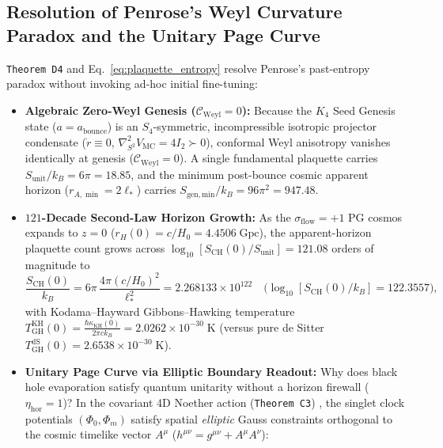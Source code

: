 \documentclass[11pt,a4paper]{article}
\theoremstyle{remark}
\begin{document}
\subsection{Resolution of Penrose's Weyl Curvature Paradox and the Unitary Page Curve}

\texttt{Theorem D4} and Eq.~\eqref{eq:plaquette_entropy} resolve Penrose's past-entropy paradox \cite{Penrose1979Weyl} without invoking ad-hoc initial fine-tuning:
\begin{itemize}
  \item \textbf{Algebraic Zero-Weyl Genesis ($\mathcal{C}_{\mathrm{Weyl}} = 0$):} Because the $K_4$ Seed Genesis state ($a = a_{\mathrm{bounce}}$) is an $S_4$-symmetric, incompressible isotropic projector condensate ($\dot{r} \equiv 0$, $\nabla^2_{S^2} V_{\mathrm{MC}} = 4I_2 \succ 0$), conformal Weyl anisotropy vanishes identically at genesis ($\mathcal{C}_{\mathrm{Weyl}} = 0$). A single fundamental plaquette carries $S_{\mathrm{unit}}/k_B = 6\pi = 18.85$, and the minimum post-bounce cosmic apparent horizon ($r_{A,\min} = 2\ell_*$) carries $S_{\mathrm{gen,min}}/k_B = 96\pi^2 = 947.48$.
  \item \textbf{$121$-Decade Second-Law Horizon Growth:} As the $\sigma_{\mathrm{flow}} = +1$ PG cosmos expands to $z = 0$ ($r_H(0) = c/H_0 = 4.4506\;\mathrm{Gpc}$), the apparent-horizon plaquette count grows across $\log_{10}[S_{\mathrm{CH}}(0)/S_{\mathrm{unit}}] = 121.08$ orders of magnitude to
  \begin{equation}
    \frac{S_{\mathrm{CH}}(0)}{k_B} = 6\pi\,\frac{4\pi(c/H_0)^2}{\ell_*^2} = 2.268133 \times 10^{122} \quad \bigl(\log_{10}[S_{\mathrm{CH}}(0)/k_B] = 122.3557\bigr),
    \label{eq:s_ch_z0}
  \end{equation}
  with Kodama--Hayward Gibbons--Hawking temperature $T_{\mathrm{GH}}^{\mathrm{KH}}(0) = \frac{\hbar\kappa_{\mathrm{KH}}(0)}{2\pi c k_B} = 2.0262 \times 10^{-30}\;\mathrm{K}$ (versus pure de Sitter $T_{\mathrm{GH}}^{\mathrm{dS}}(0) = 2.6538 \times 10^{-30}\;\mathrm{K}$).
  \item \textbf{Unitary Page Curve via Elliptic Boundary Readout:} Why does black hole evaporation satisfy quantum unitarity \cite{Page1993} without a horizon firewall ($\eta_{\mathrm{hor}} = 1$)? In the covariant 4D Noether action (\texttt{Theorem C3}) \cite{JolcsakTauFoundationSeries2026}, the singlet clock potentials $(\Phi_0, \Phi_m)$ satisfy spatial \emph{elliptic} Gauss constraints orthogonal to the cosmic timelike vector $A^\mu$ ($h^{\mu\nu} = g^{\mu\nu} + A^\mu A^\nu$):
  \begin{equation}

\end{equation}
\end{itemize}
\end{document}
